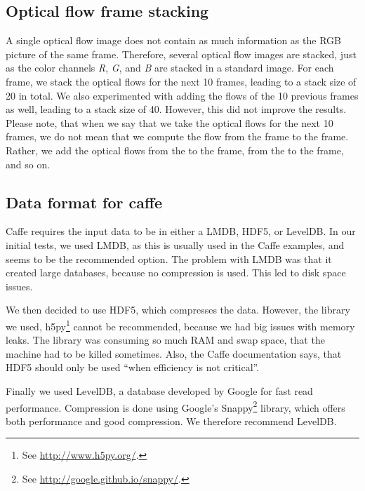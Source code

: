 
\subsection{Optical flow frame stacking}
A single optical flow image does not contain as much information as the RGB picture of the same frame.
Therefore, several optical flow images are stacked, just as the color channels \emph{R}, \emph{G}, and \emph{B} are stacked in a standard image.
For each frame, we stack the optical flows for the next 10 frames, leading to a stack size of 20 in total.
We also experimented with adding the flows of the 10 previous frames as well, leading to a stack size of 40.
However, this did not improve the results.
Please note, that when we say that we take the optical flows for the next 10 frames, we do not mean that we compute the flow from the  frame to the  frame.
Rather, we add the optical flows from the  to the  frame, from the  to the  frame, and so on.

\subsection{Data format for caffe}
Caffe requires the input data to be in either a LMDB, HDF5, or LevelDB.
In our initial tests, we used LMDB, as this is usually used in the Caffe examples, and seems to be the recommended option.
The problem with LMDB was that it created large databases, because no compression is used.
This led to disk space issues.

We then decided to use HDF5, which compresses the data.
However, the library we used, h5py\footnote{See \url{http://www.h5py.org/}.} cannot be recommended, because we had big issues with memory leaks.
The library was consuming so much RAM and swap space, that the machine had to be killed sometimes.
Also, the Caffe documentation says, that HDF5 should only be used ``when efficiency is not critical''.

Finally we used LevelDB, a database developed by Google for fast read performance.
Compression is done using Google's Snappy\footnote{See \url{http://google.github.io/snappy/}.} library, which offers both performance and good compression.
We therefore recommend LevelDB.


